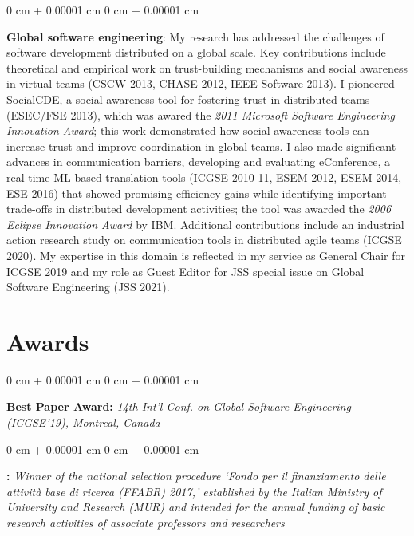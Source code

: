 \documentclass[10pt, a4paper]{article}
\newenvironment{onecolentry}{
    \begin{adjustwidth}{
        0 cm + 0.00001 cm
    }{
        0 cm + 0.00001 cm
    }
}{
    \end{adjustwidth}
} %
\let\hrefWithoutArrow\href
\renewcommand{\href}[2]{\hrefWithoutArrow{#1}{\ifthenelse{\equal{#2}{}}{ }{#2 }\raisebox{.15ex}{\footnotesize \faExternalLink*}}}
\begin{document}
        \begin{onecolentry}
            \textbf{Global software engineering}: My research has addressed the challenges of software development distributed on a global scale. Key contributions include theoretical and empirical work on trust-building mechanisms and social awareness in virtual teams (CSCW 2013, CHASE 2012, IEEE Software 2013). I pioneered SocialCDE, a social awareness tool for fostering trust in distributed teams (ESEC/FSE 2013), which was awared the \textit{2011 Microsoft Software Engineering Innovation Award}; this work demonstrated how social awareness tools can increase trust and improve coordination in global teams. I also made significant advances in communication barriers, developing and evaluating eConference, a real-time ML-based translation tools (ICGSE 2010-11, ESEM 2012, ESEM 2014, ESE 2016) that showed promising efficiency gains while identifying important trade-offs in distributed development activities; the tool was awarded the \textit{2006 Eclipse Innovation Award} by IBM. Additional contributions include an industrial action research study on communication tools in distributed agile teams (ICGSE 2020). My expertise in this domain is reflected in my service as General Chair for ICGSE 2019 and my role as Guest Editor for JSS special issue on Global Software Engineering (JSS 2021).
        \end{onecolentry}


    
    \section{Awards}



        
        \begin{onecolentry}
            \textbf{Best Paper Award:} \textit{14th Int'l Conf. on Global Software Engineering (ICGSE'19), Montreal, Canada}
        \end{onecolentry}

        \vspace{0.2 cm}

        \begin{onecolentry}
            \textbf{\href{https://www.anvur.it/wp-content/uploads/2018/05/Beneficiari_FFABR_Ricercatori.pdf}{FABBR 2017 Award}:} \textit{Winner of the national selection procedure `Fondo per il finanziamento delle attività base di ricerca (FFABR) 2017,' established by the Italian Ministry of University and Research (MUR) and intended for the annual funding of basic research activities of associate professors and researchers}
        \end{onecolentry}
\end{document}
